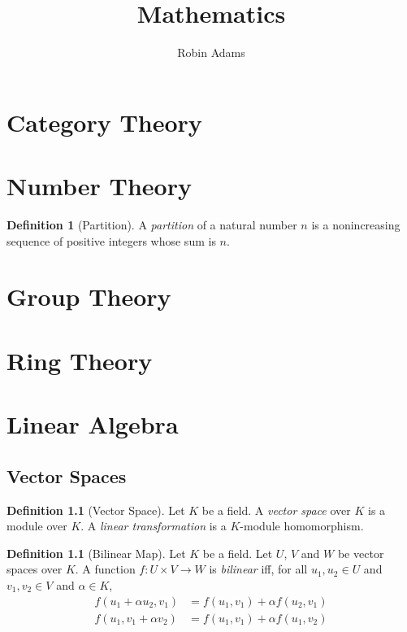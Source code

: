 \documentclass{book}
\title{Mathematics}
\author{Robin Adams}
\theoremstyle{definition}
\newtheorem{df}[prop]{Definition}
\begin{document}
\maketitle
\tableofcontents


\part{Category Theory}



\part{Number Theory}

\begin{df}[Partition]
A \emph{partition} of a natural number $n$ is a nonincreasing sequence of positive integers whose sum is $n$.
\end{df}

\part{Group Theory}



\part{Ring Theory}



\part{Linear Algebra}

\chapter{Vector Spaces}

\begin{df}[Vector Space]
Let $K$ be a field. A \emph{vector space} over $K$ is a module over $K$. A \emph{linear transformation} is a $K$-module homomorphism.
\end{df}

\begin{df}[Bilinear Map]
Let $K$ be a field. Let $U$, $V$ and $W$ be vector spaces over $K$. A function $f : U \times V \rightarrow W$ is \emph{bilinear} iff, for all $u_1, u_2 \in U$ and $v_1,v_2 \in V$ and $\alpha \in K$,
\begin{align*}
f(u_1 + \alpha u_2, v_1) & = f(u_1,v_1) + \alpha f(u_2,v_1) \\
f(u_1, v_1 + \alpha v_2) & = f(u_1,v_1) + \alpha f(u_1,v_2)
\end{align*}
\end{df}
\end{document}
